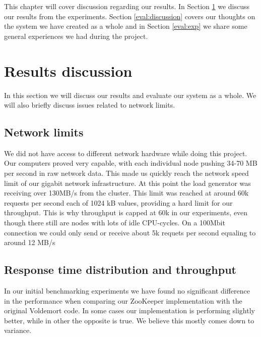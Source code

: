 This chapter will cover discussion regarding our results. In Section \ref{eval:results} we discuss our results from the experiments. Section \ref{eval:discussion} covers our thoughts on the system we have created as a whole and in Section \ref{eval:exp} we share some general experiences we had during the project.



\section{Results discussion}
\label{eval:results}
In this section we will discuss our results and evaluate our system as a whole. We will also briefly discuss issues related to network limits.  

\subsection{Network limits}
We did not have access to different network hardware while doing this project. Our computers proved very capable, with each individual node pushing 34-70 MB per second in raw network data. This made us quickly reach the network speed limit of our gigabit network infrastructure. At this point the load generator was receiving over 130MB/s from the cluster. This limit was reached at around 60k requests per second each of 1024 kB values, providing a hard limit for our throughput. This is why throughput is capped at 60k in our experiments, even though there still are nodes with lots of idle CPU-cycles. On a 100Mbit connection we could only send or receive about 5k requets per second equaling to around 12 MB/s

\subsection{Response time distribution and throughput}
\label{eval:performance}
In our initial benchmarking experiments we have found no significant difference in the performance when comparing our ZooKeeper implementation with the original Voldemort code. In some cases our implementation is performing slightly better, while in other the opposite is true. We believe this mostly comes down to variance.

